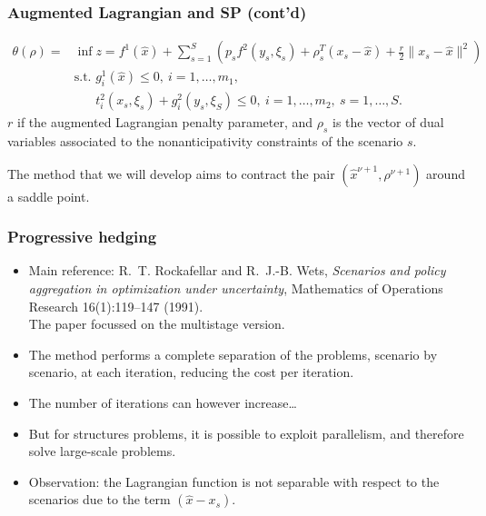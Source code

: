 \documentclass[french]{beamer}
\begin{document}
\begin{frame}
\frametitle{Augmented Lagrangian and SP (cont'd)}

\vspace*{-0.5cm}

\begin{align*}
\theta(\rho) = & \inf z = f^1(\hat{x}) + \sum_{s=1}^{S} \left(
  p_sf^2(y_s,\xi_s) + \rho_s^T(x_s-\hat{x}) + \frac{r}{2} \|
x_s-\hat{x} \|^2\right) \\
& \text{s.t. } g_i^1(\hat{x}) \leq 0,\ i=1,\ldots{},m_1,\\
& \phantom{\text{s.t. }} t_i^2(x_s,\xi_s)+g_i^2(y_s,\xi_S) \leq 0,\ 
i=1,\ldots{},m_2,\ s=1,\ldots{},S.
\end{align*}
$r$ if the augmented Lagrangian penalty parameter, and $\rho_s$ is the vector of dual variables associated to the nonanticipativity constraints of the scenario  $s$.

\mbox{}

The method that we will develop aims to contract the pair $(\hat{x}^{\nu+1}, \rho^{\nu+1})$ around a saddle point.

\end{frame}

\begin{frame}
\frametitle{Progressive hedging}

\begin{itemize}
\item
Main reference:
R.~T. Rockafellar and R.~J.-B. Wets, {\sl Scenarios and policy aggregation
in optimization under uncertainty}, Mathematics of Operations
  Research 16(1):119--147 (1991).\\
  The paper focussed on the multistage version.
\item
The method performs a complete separation of the problems, scenario by scenario, at each iteration, reducing the cost per iteration.
\item
The number of iterations can however increase\ldots
\item
But for structures problems, it is possible to exploit parallelism, and therefore solve large-scale problems.
\item
{\red Observation}:
the Lagrangian function is not separable with respect to the scenarios due to the term $(\hat{x}-x_s)$.
\end{itemize}

\end{frame}
\end{document}
